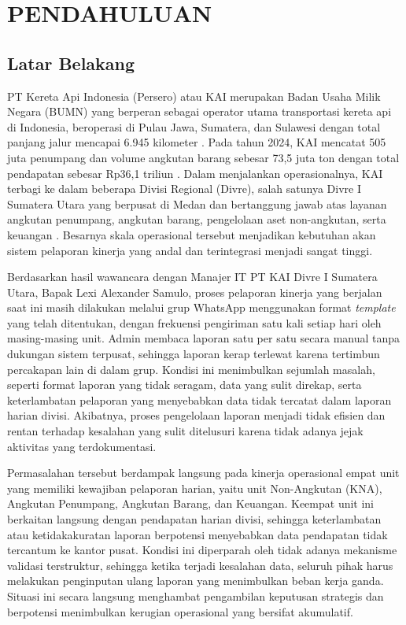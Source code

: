\newpage
\chapter{PENDAHULUAN} \label{Bab I}

\section{Latar Belakang} \label{I.Latar Belakang}
PT Kereta Api Indonesia (Persero) atau KAI merupakan Badan Usaha Milik Negara (BUMN) yang berperan sebagai operator utama transportasi kereta api di Indonesia, beroperasi di Pulau Jawa, Sumatera, dan Sulawesi dengan total panjang jalur mencapai 6.945 kilometer \cite{kai2024wiki}. Pada tahun 2024, KAI mencatat 505 juta penumpang dan volume angkutan barang sebesar 73,5 juta ton dengan total pendapatan sebesar Rp36,1 triliun \cite{kai2024wiki}. Dalam menjalankan operasionalnya, KAI terbagi ke dalam beberapa Divisi Regional (Divre), salah satunya Divre I Sumatera Utara yang berpusat di Medan dan bertanggung jawab atas layanan angkutan penumpang, angkutan barang, pengelolaan aset non-angkutan, serta keuangan \cite{kai2024wiki}. Besarnya skala operasional tersebut menjadikan kebutuhan akan sistem pelaporan kinerja yang andal dan terintegrasi menjadi sangat tinggi. \par

Berdasarkan hasil wawancara dengan Manajer IT PT KAI Divre I Sumatera Utara, Bapak Lexi Alexander Samulo, proses pelaporan kinerja yang berjalan saat ini masih dilakukan melalui grup WhatsApp menggunakan format \textit{template} yang telah ditentukan, dengan frekuensi pengiriman satu kali setiap hari oleh masing-masing unit. Admin membaca laporan satu per satu secara manual tanpa dukungan sistem terpusat, sehingga laporan kerap terlewat karena tertimbun percakapan lain di dalam grup. Kondisi ini menimbulkan sejumlah masalah, seperti format laporan yang tidak seragam, data yang sulit direkap, serta keterlambatan pelaporan yang menyebabkan data tidak tercatat dalam laporan harian divisi. Akibatnya, proses pengelolaan laporan menjadi tidak efisien dan rentan terhadap kesalahan yang sulit ditelusuri karena tidak adanya jejak aktivitas yang terdokumentasi. \par

Permasalahan tersebut berdampak langsung pada kinerja operasional empat unit yang memiliki kewajiban pelaporan harian, yaitu unit Non-Angkutan (KNA), Angkutan Penumpang, Angkutan Barang, dan Keuangan. Keempat unit ini berkaitan langsung dengan pendapatan harian divisi, sehingga keterlambatan atau ketidakakuratan laporan berpotensi menyebabkan data pendapatan tidak tercantum ke kantor pusat. Kondisi ini diperparah oleh tidak adanya mekanisme validasi terstruktur, sehingga ketika terjadi kesalahan data, seluruh pihak harus melakukan penginputan ulang laporan yang menimbulkan beban kerja ganda. Situasi ini secara langsung menghambat pengambilan keputusan strategis dan berpotensi menimbulkan kerugian operasional yang bersifat akumulatif. \par

